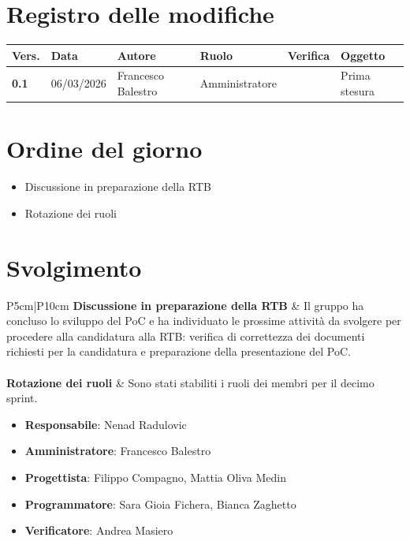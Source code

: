 \documentclass[a4paper,12pt]{article}
\begin{document}
    

    \newpage
    \section*{Registro delle modifiche}

    \begin{table}[h!]
        \begin{tabularx}{\textwidth}{|l|l|l|l|X|X|}
            \hline
            \textbf{Vers.} & \textbf{Data} & \textbf{Autore} & \textbf{Ruolo} & \textbf{Verifica} & \textbf{Oggetto} \\
            \hline
            \textbf{0.1} & 06/03/2026 & Francesco Balestro & Amministratore &  & Prima stesura \\
        \hline
        \end{tabularx}
    \end{table}

    \newpage
    \tableofcontents
    \newpage

    \section{Ordine del giorno} {
        \begin{itemize}
            \item Discussione in preparazione della RTB
            \item Rotazione dei ruoli
        \end{itemize}
    }

    \section{Svolgimento} {
        \begin{longtable}{P{5cm}|P{10cm}} 
            \textbf{Discussione in preparazione della RTB} & Il gruppo ha concluso lo sviluppo del PoC e ha individuato le prossime attività da svolgere per procedere alla candidatura alla RTB: verifica di correttezza dei documenti richiesti per la candidatura e preparazione della presentazione del PoC.\\\\
            \textbf{Rotazione dei ruoli} & Sono stati stabiliti i ruoli dei membri per il decimo sprint.
            \begin{itemize}
                \item \textbf{Responsabile}:  Nenad Radulovic
                \item \textbf{Amministratore}: Francesco Balestro
                \item \textbf{Progettista}: Filippo Compagno, Mattia Oliva Medin
                \item \textbf{Programmatore}: Sara Gioia Fichera, Bianca Zaghetto
                \item \textbf{Verificatore}: Andrea Masiero
            \end{itemize}\\\\
        \end{longtable}
    }
\end{document}
